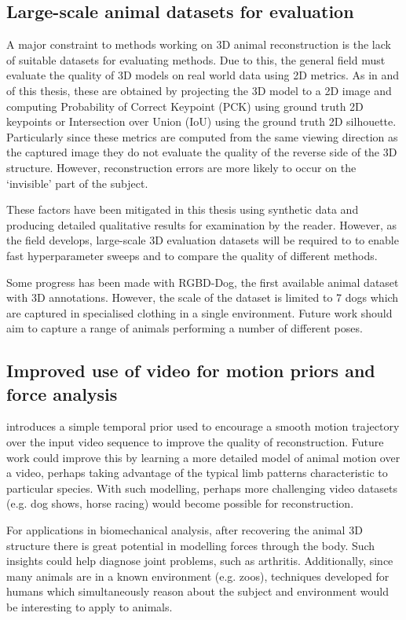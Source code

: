 \subsection{Large-scale animal datasets for evaluation}

A major constraint to methods working on 3D animal reconstruction is the lack of suitable datasets for evaluating methods. Due to this, the general field must evaluate the quality of 3D models on real world data using 2D metrics. As in  and  of this thesis, these are obtained by projecting the 3D model to a 2D image and computing Probability of Correct Keypoint (PCK) using ground truth 2D keypoints or Intersection over Union (IoU) using the ground truth 2D silhouette. Particularly since these metrics are computed from the same viewing direction as the captured image they do not evaluate the quality of the reverse side of the 3D structure. However, reconstruction errors are more likely to occur on the `invisible' part of the subject. 

These factors have been mitigated in this thesis using synthetic data and producing detailed qualitative results for examination by the reader. However, as the field develops, large-scale 3D evaluation datasets will be required to to enable fast hyperparameter sweeps and to compare the quality of different methods. 

Some progress has been made with RGBD-Dog, the first available animal dataset with 3D annotations. However, the scale of the dataset is limited to 7 dogs which are captured in specialised clothing in a single environment. Future work should aim to capture a range of animals performing a number of different poses. 

\subsection{Improved use of video for motion priors and force analysis}

 introduces a simple temporal prior used to encourage a smooth motion trajectory over the input video sequence to improve the quality of reconstruction. Future work could improve this by learning a more detailed model of animal motion over a video, perhaps taking advantage of the typical limb patterns characteristic to particular species. With such modelling, perhaps more challenging video datasets (e.g. dog shows, horse racing) would become possible for reconstruction. 

For applications in biomechanical analysis, after recovering the animal 3D structure there is great potential in modelling forces through the body. Such insights could help diagnose joint problems, such as arthritis. Additionally, since many animals are in a known environment (e.g. zoos), techniques developed for humans which simultaneously reason about the subject and environment would be interesting to apply to animals. 

